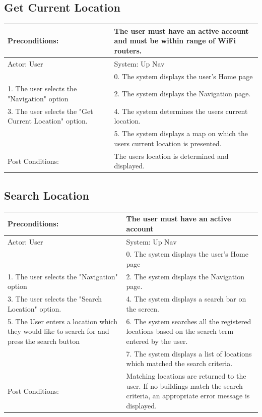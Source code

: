 \documentclass{article}
\begin{document}
\begin{enumerate}
	\subsection{Get Current Location}
	
	\begin{tabular}{ | m{15em} | m{15em}| } 
		\hline
		Preconditions: 							& The user must have an active account and must be within range of WiFi routers. \\
		\hline
		Actor: User 								&  System: Up Nav \\ 
		\hline
											& 0. The system  displays the user's Home page\\ 
		\hline
		1. The user selects the "Navigation" option			& 2. The system displays the Navigation page. \\
		\hline
		3. The user selects the "Get Current Location" option. 	& 4. The system determines the users current location. \\
		\hline																
											& 5. The system displays a map on which the users current location is presented. \\
		\hline
		Post Conditions: 							& The users location is determined and displayed. \\
		\hline
	\end{tabular}

	\subsection{Search Location}
	\begin{tabular}{ | m{15em} | m{15em}| } 
		\hline
		Preconditions: 													& The user must have an active account \\
		\hline
		Actor: User 														&  System: Up Nav \\ 
		\hline
																	& 0. The system  displays the user's Home page\\ 
		\hline
		1. The user selects the "Navigation" option									& 2. The system displays the Navigation page. \\
		\hline
		3. The user selects the "Search Location" option.								& 4. The system displays a search bar on the screen. \\ 
		\hline
		5. The User enters a location which they would like to search for and press the search button		& 6. The system searches all the registered locations based on the search term entered by the user. \\
		\hline
																	& 7. The system displays a list of locations which matched the search criteria. \\
		\hline
		Post Conditions:													&Matching locations are returned to the user. If no buildings match the search criteria, an appropriate error message is displayed. \\
		\hline
	\end{tabular}


\end{enumerate}
\end{document}
